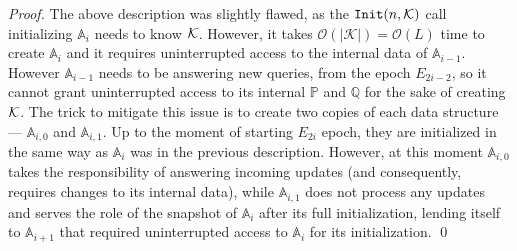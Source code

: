 \documentclass[runningheads]{llncs}
\newcommand{\Oh}{\mathcal{O}}
\begin{document}
\begin{proof}
The above description was slightly flawed, as the $\mathtt{Init}(n, \cal K)$ call initializing $\mathbb{A}_{i}$ needs to know $\cal K$. However, it takes $\Oh(|\mathcal{K}|) = \Oh(L)$ time to create $\mathbb{A}_i$ and it requires uninterrupted access to the internal data of $\mathbb{A}_{i-1}$. However $\mathbb{A}_{i-1}$ needs to be answering new queries, from the epoch $E_{2i-2}$, so it cannot grant uninterrupted access to its internal $\mathbb{P}$ and $\mathbb{Q}$ for the sake of creating $\cal K$. The trick to mitigate this issue is to create two copies of each data structure --- $\mathbb{A}_{i, 0}$ and $\mathbb{A}_{i, 1}$. Up to the moment of starting $E_{2i}$ epoch, they are initialized in the same way as $\mathbb{A}_i$ was in the previous description. However, at this moment $\mathbb{A}_{i, 0}$ takes the responsibility of answering incoming updates (and consequently, requires changes to its internal data), while $\mathbb{A}_{i, 1}$ does not process any updates and serves the role of the snapshot of $\mathbb{A}_i$ after its full initialization, lending itself to $\mathbb{A}_{i+1}$ that required uninterrupted access to $\mathbb{A}_i$ for its initialization.
\qed
\end{proof}

 


\end{document}
